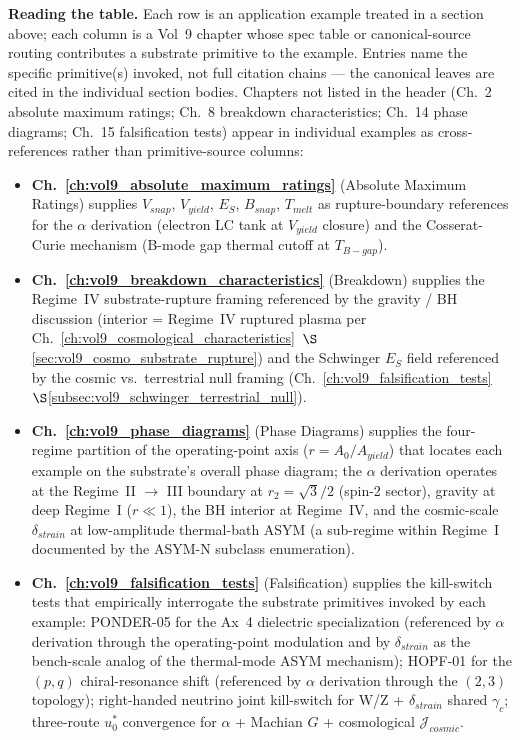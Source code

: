 \noindent
\textbf{Reading the table.} Each row is an application example treated in a section above; each column is a Vol~9 chapter whose spec table or canonical-source routing contributes a substrate primitive to the example. Entries name the specific primitive(s) invoked, not full citation chains --- the canonical leaves are cited in the individual section bodies. Chapters not listed in the header (Ch.~2 absolute maximum ratings; Ch.~8 breakdown characteristics; Ch.~14 phase diagrams; Ch.~15 falsification tests) appear in individual examples as cross-references rather than primitive-source columns:

\begin{itemize}
    \item \textbf{Ch.~\ref{ch:vol9_absolute_maximum_ratings}} (Absolute Maximum Ratings) supplies $V_{snap}$, $V_{yield}$, $E_S$, $B_{snap}$, $T_{melt}$ as rupture-boundary references for the $\alpha$ derivation (electron LC tank at $V_{yield}$ closure) and the Cosserat-Curie mechanism (B-mode gap thermal cutoff at $T_{B-gap}$).
    \item \textbf{Ch.~\ref{ch:vol9_breakdown_characteristics}} (Breakdown) supplies the Regime~IV substrate-rupture framing referenced by the gravity / BH discussion (interior = Regime~IV ruptured plasma per Ch.~\ref{ch:vol9_cosmological_characteristics}~$\S$\ref{sec:vol9_cosmo_substrate_rupture}) and the Schwinger $E_S$ field referenced by the cosmic vs.\ terrestrial null framing (Ch.~\ref{ch:vol9_falsification_tests}~$\S$\ref{subsec:vol9_schwinger_terrestrial_null}).
    \item \textbf{Ch.~\ref{ch:vol9_phase_diagrams}} (Phase Diagrams) supplies the four-regime partition of the operating-point axis ($r = A_0/A_{yield}$) that locates each example on the substrate's overall phase diagram; the $\alpha$ derivation operates at the Regime~II $\to$ III boundary at $r_2 = \sqrt{3}/2$ (spin-2 sector), gravity at deep Regime~I ($r \ll 1$), the BH interior at Regime~IV, and the cosmic-scale $\delta_{strain}$ at low-amplitude thermal-bath ASYM (a sub-regime within Regime~I documented by the ASYM-N subclass enumeration).
    \item \textbf{Ch.~\ref{ch:vol9_falsification_tests}} (Falsification) supplies the kill-switch tests that empirically interrogate the substrate primitives invoked by each example: PONDER-05 for the Ax~4 dielectric specialization (referenced by $\alpha$ derivation through the operating-point modulation and by $\delta_{strain}$ as the bench-scale analog of the thermal-mode ASYM mechanism); HOPF-01 for the $(p,q)$ chiral-resonance shift (referenced by $\alpha$ derivation through the $(2,3)$ topology); right-handed neutrino joint kill-switch for W/Z + $\delta_{strain}$ shared $\gamma_c$; three-route $u_0^*$ convergence for $\alpha$ + Machian $G$ + cosmological $\mathcal{J}_{cosmic}$.
\end{itemize}

